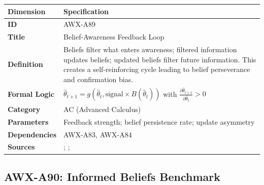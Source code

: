 \begin{table}[htbp]
\small
\begin{tabular}{p{3cm}p{11cm}}
\toprule
\textbf{Dimension} & \textbf{Specification} \\
\midrule
\textbf{ID} & AWX-A89 \\
\textbf{Title} & Belief-Awareness Feedback Loop \\
\textbf{Definition} & Beliefs filter what enters awareness; filtered information updates beliefs; updated beliefs filter future information. This creates a self-reinforcing cycle leading to belief perseverance and confirmation bias. \\
\textbf{Formal Logic} & $\hat{\theta}_{t+1} = g(\hat{\theta}_t, \text{signal} \times B(\hat{\theta}_t))$ with $\frac{\partial \hat{\theta}_{t+1}}{\partial \hat{\theta}_t} > 0$ \\
\textbf{Category} & AC (Advanced Calculus) \\
\textbf{Parameters} & Feedback strength; belief persistence rate; update asymmetry \\
\textbf{Dependencies} & AWX-A83, AWX-A84 \\
\textbf{Sources} & \citet{rabin1999first}; \citet{lord1979biased}; \citet{nickerson1998confirmation} \\
\bottomrule
\end{tabular}
\end{table}


\subsection{AWX-A90: Informed Beliefs Benchmark}

